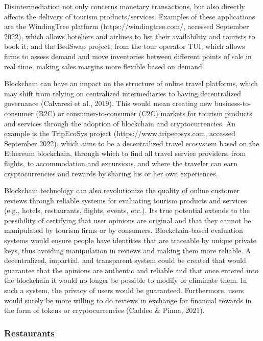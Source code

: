 \documentclass[
  letterpaper,
  DIV=11,
  numbers=noendperiod]{scrreprt}
\begin{document}
Disintermediation not only concerns monetary transactions, but also
directly affects the delivery of tourism products/services. Examples of
these applications are the WindingTree platform
(https://windingtree.com/, accessed September 2022), which allows
hoteliers and airlines to list their availability and tourists to book
it; and the BedSwap project, from the tour operator TUI, which allows
firms to assess demand and move inventories between different points of
sale in real time, making sales margins more flexible based on demand.

Blockchain can have an impact on the structure of online travel
platforms, which may shift from relying on centralized intermediaries to
having decentralized governance (Calvaresi et al., 2019). This would
mean creating new business-to-consumer (B2C) or consumer-to-consumer
(C2C) markets for tourism products and services through the adoption of
blockchain and cryptocurrencies. An example is the TripEcoSys project
(https://www.tripecosys.com, accessed September 2022), which aims to be
a decentralized travel ecosystem based on the Ethereum blockchain,
through which to find all travel service providers, from flights, to
accommodation and excursions, and where the traveler can earn
cryptocurrencies and rewards by sharing his or her own experiences.

Blockchain technology can also revolutionize the quality of online
customer reviews through reliable systems for evaluating tourism
products and services (e.g., hotels, restaurants, flights, events,
etc.). Its true potential extends to the possibility of certifying that
user opinions are original and that they cannot be manipulated by
tourism firms or by consumers. Blockchain-based evaluation systems would
ensure people have identities that are traceable by unique private keys,
thus avoiding manipulation in reviews and making them more reliable. A
decentralized, impartial, and transparent system could be created that
would guarantee that the opinions are authentic and reliable and that
once entered into the blockchain it would no longer be possible to
modify or eliminate them. In such a system, the privacy of users would
be guaranteed. Furthermore, users would surely be more willing to do
reviews in exchange for financial rewards in the form of tokens or
cryptocurrencies (Caddeo \& Pinna, 2021).

\hypertarget{restaurants}{%
\subsubsection{Restaurants}\label{restaurants}}
\end{document}
